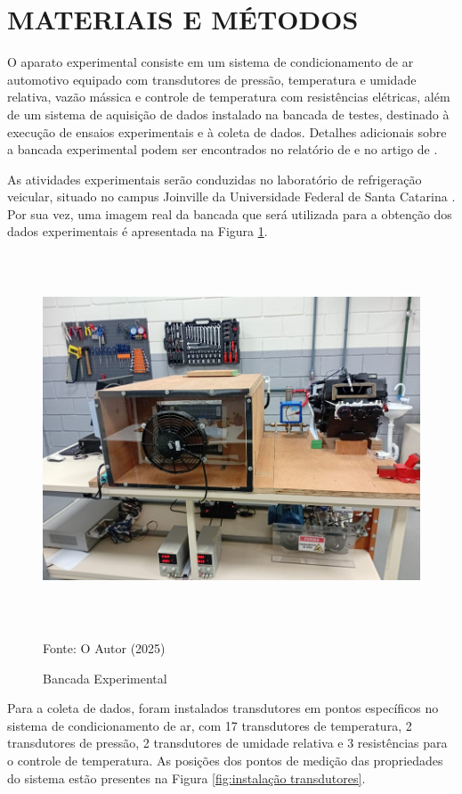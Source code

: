 \section[\MakeUppercase{Materiais e Métodos}]{\texorpdfstring{\MakeUppercase{Materiais e Métodos}}{MATERIAIS E MÉTODOS}}\label{sec:materiais e métodos}

O aparato experimental consiste em um sistema de condicionamento de ar automotivo equipado com transdutores de pressão, temperatura e umidade relativa, vazão mássica e controle de temperatura com resistências elétricas, além de um sistema de aquisição de dados instalado na bancada de testes, destinado à execução de ensaios experimentais e à coleta de dados. Detalhes adicionais sobre a bancada experimental podem ser encontrados no relatório de \textcite{deoliveira2023} e no artigo de \textcite{dasilva2024}.

As atividades experimentais serão conduzidas no laboratório de refrigeração veicular, situado no campus Joinville da Universidade Federal de Santa Catarina \cite{reve2023}. Por sua vez, uma imagem real da bancada que será utilizada para a obtenção dos dados experimentais é apresentada na Figura \ref{fig:bancada de teste}.

\begin{figure}[ht]
    \centering
     \caption{Bancada Experimental}
    \includegraphics[width=13.56cm, height=10.99cm]{FigurasdoTexto/Bancada Experimental1.png}
    \vspace{5pt}  %
    
    {\footnotesize Fonte: O Autor (2025)}  %
    \label{fig:bancada de teste}
\end{figure}
\newpage
Para a coleta de dados, foram instalados transdutores em pontos específicos no sistema de condicionamento de ar, com 17 transdutores de temperatura, 2 transdutores de pressão, 2 transdutores de umidade relativa e 3 resistências para o controle de temperatura. As posições dos pontos de medição das propriedades do sistema estão presentes na Figura \ref{fig:instalação transdutores}. 

